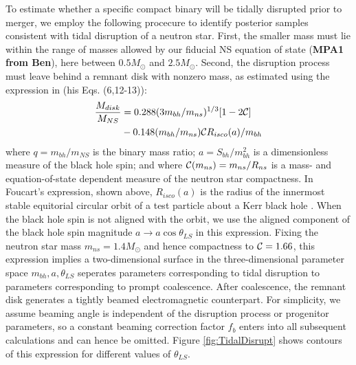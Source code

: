 \documentclass[nofootinbib,twocolumn,prd]{emulateapj}
\begin{document}
To estimate whether a specific compact binary will be tidally disrupted prior to merger, we employ the
following procecure to identify posterior samples consistent with tidal disruption of a neutron star.  First, the
smaller mass must lie within the range of masses allowed by our fiducial NS equation of state (\textbf{MPA1 from Ben}), here
between $0.5 M_\odot$ and $2.5 M_\odot$.  Second, the disruption process must leave behind a remnant disk with nonzero
mass, as estimated using the expression in \cite{2012PhRvD..86l4007F} (his Eqs. (6,12-13)):
\begin{align}
\frac{M_{disk}}{M_{NS}} &=
 0.288 (3 m_{bh}/m_{ns})^{1/3}[1-2 {\cal C}] 
\nonumber \\
&
 -0.148 (m_{bh}/m_{ns})  {\cal C} R_{isco}(a)/m_{bh} 
\label{eq:Mdisk}
\end{align}
where $q=m_{bh}/m_{NS}$ is the binary mass ratio; $a=S_{bh}/m_{bh}^2$ is a dimensionless measure of the black hole spin;
and  where ${\cal C}(m_{ns})=m_{ns}/R_{ns}$ is a mass- and equation-of-state dependent  measure of the neutron star
compactness.  In Foucart's expression, shown above, $R_{isco}(a)$ is the radius of the  innermost stable equitorial circular orbit  of a test particle
about a Kerr black hole  \citep{1972ApJ...178..347B}. %
When the black hole spin is not aligned with the orbit, we use the aligned component of the black hole spin magnitude $a\rightarrow a \cos \theta_{LS}$ in this
expression.   Fixing the neutron star mass $m_{ns}=1.4 M_\odot$ and hence compactness to ${\cal C}=1.66$, this expression implies a two-dimensional surface in
the three-dimensional parameter space $m_{bh},a,\theta_{LS}$ seperates parameters corresponding to tidal disruption to
parameters corresponding to prompt coalescence.
%
After coalescence, the remnant disk generates a tightly beamed electromagnetic counterpart.  For simplicity, we assume
beaming angle is independent of the disruption process or progenitor parameters, so a constant beaming correction factor $f_b$ enters into all
subsequent calculations and can hence be omitted.  
%
Figure \ref{fig:TidalDisrupt} shows contours of this expression for different values of $\theta_{LS}$.
\end{document}

